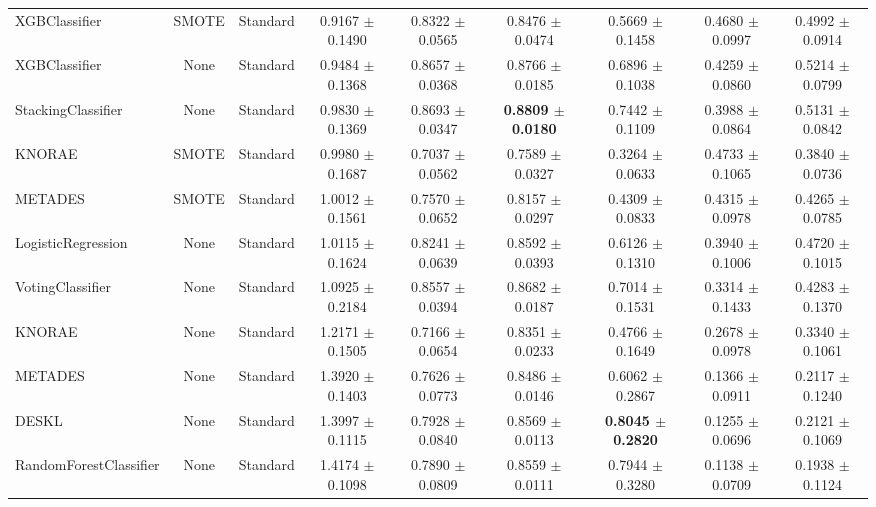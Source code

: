 \documentclass[conference]{IEEEtran}
\begin{document}
\begin{table}[h]
\begin{threeparttable}
{\begin{tabular}{lcc|cccccc}
            XGBClassifier & SMOTE & Standard & 0.9167 $\pm$ 0.1490 & 0.8322 $\pm$ 0.0565 & 0.8476 $\pm$ 0.0474 & 0.5669 $\pm$ 0.1458 & 0.4680 $\pm$ 0.0997 & 0.4992 $\pm$ 0.0914 \\
            XGBClassifier & None & Standard & 0.9484 $\pm$ 0.1368 & 0.8657 $\pm$ 0.0368 & 0.8766 $\pm$ 0.0185 & 0.6896 $\pm$ 0.1038 & 0.4259 $\pm$ 0.0860 & 0.5214 $\pm$ 0.0799 \\
            StackingClassifier & None & Standard & 0.9830 $\pm$ 0.1369 & 0.8693 $\pm$ 0.0347 & \textbf{0.8809 $\pm$ 0.0180} & 0.7442 $\pm$ 0.1109 & 0.3988 $\pm$ 0.0864 & 0.5131 $\pm$ 0.0842 \\
            KNORAE & SMOTE & Standard & 0.9980 $\pm$ 0.1687 & 0.7037 $\pm$ 0.0562 & 0.7589 $\pm$ 0.0327 & 0.3264 $\pm$ 0.0633 & 0.4733 $\pm$ 0.1065 & 0.3840 $\pm$ 0.0736 \\
            METADES & SMOTE & Standard & 1.0012 $\pm$ 0.1561 & 0.7570 $\pm$ 0.0652 & 0.8157 $\pm$ 0.0297 & 0.4309 $\pm$ 0.0833 & 0.4315 $\pm$ 0.0978 & 0.4265 $\pm$ 0.0785 \\
            LogisticRegression & None & Standard & 1.0115 $\pm$ 0.1624 & 0.8241 $\pm$ 0.0639 & 0.8592 $\pm$ 0.0393 & 0.6126 $\pm$ 0.1310 & 0.3940 $\pm$ 0.1006 & 0.4720 $\pm$ 0.1015 \\
            VotingClassifier & None & Standard & 1.0925 $\pm$ 0.2184 & 0.8557 $\pm$ 0.0394 & 0.8682 $\pm$ 0.0187 & 0.7014 $\pm$ 0.1531 & 0.3314 $\pm$ 0.1433 & 0.4283 $\pm$ 0.1370 \\
            KNORAE & None & Standard & 1.2171 $\pm$ 0.1505 & 0.7166 $\pm$ 0.0654 & 0.8351 $\pm$ 0.0233 & 0.4766 $\pm$ 0.1649 & 0.2678 $\pm$ 0.0978 & 0.3340 $\pm$ 0.1061 \\
            METADES & None & Standard & 1.3920 $\pm$ 0.1403 & 0.7626 $\pm$ 0.0773 & 0.8486 $\pm$ 0.0146 & 0.6062 $\pm$ 0.2867 & 0.1366 $\pm$ 0.0911 & 0.2117 $\pm$ 0.1240 \\
            DESKL & None & Standard & 1.3997 $\pm$ 0.1115 & 0.7928 $\pm$ 0.0840 & 0.8569 $\pm$ 0.0113 & \textbf{0.8045 $\pm$ 0.2820} & 0.1255 $\pm$ 0.0696 & 0.2121 $\pm$ 0.1069 \\
            RandomForestClassifier & None & Standard & 1.4174 $\pm$ 0.1098 & 0.7890 $\pm$ 0.0809 & 0.8559 $\pm$ 0.0111 & 0.7944 $\pm$ 0.3280 & 0.1138 $\pm$ 0.0709 & 0.1938 $\pm$ 0.1124 \\
            \bottomrule
        \end{tabular}
        }
    \end{threeparttable}
\end{table}
\end{document}
